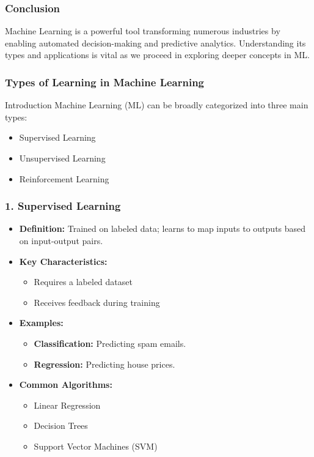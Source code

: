 \documentclass[aspectratio=169]{beamer}
\begin{document}
\begin{frame}[fragile]
    \frametitle{Conclusion}
    Machine Learning is a powerful tool transforming numerous industries by enabling automated decision-making and predictive analytics. Understanding its types and applications is vital as we proceed in exploring deeper concepts in ML.
\end{frame}

\begin{frame}[fragile]
    \frametitle{Types of Learning in Machine Learning}
    \begin{block}{Introduction}
        Machine Learning (ML) can be broadly categorized into three main types:
        \begin{itemize}
            \item Supervised Learning
            \item Unsupervised Learning
            \item Reinforcement Learning
        \end{itemize}
    \end{block}
\end{frame}

\begin{frame}[fragile]
    \frametitle{1. Supervised Learning}
    \begin{itemize}
        \item \textbf{Definition:} Trained on labeled data; learns to map inputs to outputs based on input-output pairs.
        \item \textbf{Key Characteristics:}
        \begin{itemize}
            \item Requires a labeled dataset
            \item Receives feedback during training
        \end{itemize}
        \item \textbf{Examples:}
        \begin{itemize}
            \item \textbf{Classification:} Predicting spam emails.
            \item \textbf{Regression:} Predicting house prices.
        \end{itemize}
        \item \textbf{Common Algorithms:} 
        \begin{itemize}
            \item Linear Regression
            \item Decision Trees
            \item Support Vector Machines (SVM)
        \end{itemize}
    \end{itemize}
\end{frame}
\end{document}
